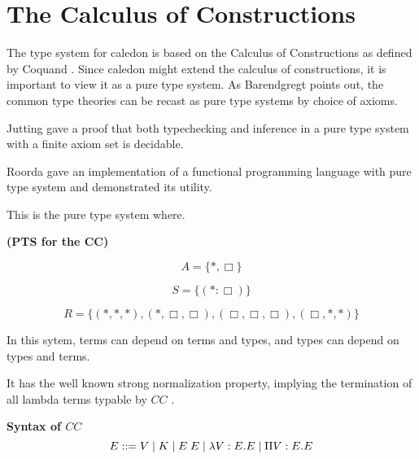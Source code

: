 \section{The Calculus of Constructions}

The type system for caledon is based on the Calculus of Constructions as defined by Coquand \citep{coquand1986calculus}.
Since caledon might extend the calculus of constructions, it is important to view it as a pure type system. 
As Barendgregt points out, the common type theories can be recast as pure type systems
by choice of axioms. 

Jutting \citep{jutting1993typing} gave a proof that both typechecking and inference
in a pure type system with a finite axiom set is decidable.

Roorda \citep{roorda2001pure} gave an implementation of a functional programming language with 
pure type system and demonstrated its utility.

This is the pure type system where.

\begin{definition}
\textbf{(PTS for the CC)}

\[
A = \{ *, \Box \}
\]

\[
S = \{ (* : \Box) \}
\]

\[ 
R = \{ (*,*,*),(*,\Box,\Box),(\Box,\Box,\Box),(\Box,*,*)\}
\]  

\end{definition}

In this sytem, terms can depend on terms and types, 
and types can depend on types and terms.  

It has the well known strong normalization property, implying the termination of 
all lambda terms typable by $CC$ \citep{Geuvers94ashort} \citep{geuvers1991modular}.

\begin{definition}
\textbf{ Syntax of $CC$ }
\[ 
E ::= 
V 
\; | \; K
\; | \; E\;E 
\; | \; \lambda V : E . E 
\; | \; \Pi V : E . E 
\]

\label{coc:syntax}
\end{definition}

